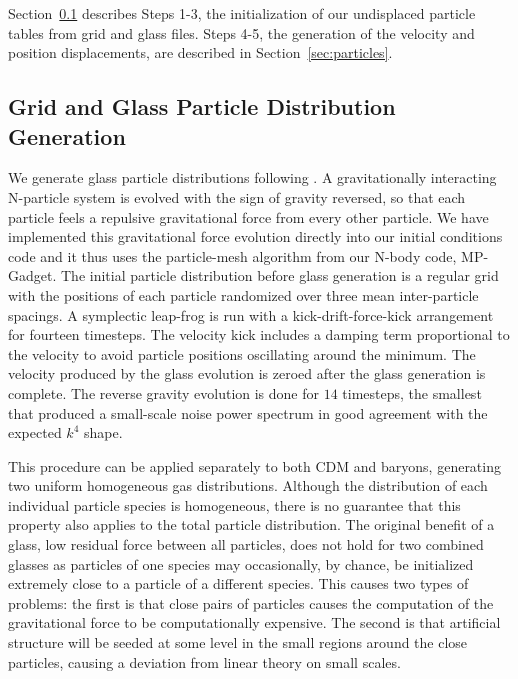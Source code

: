 \documentclass[a4paper,11pt]{article}
\begin{document}
Section~\ref{sec:glass} describes Steps 1-3, the initialization of our undisplaced particle tables from grid and glass files. Steps 4-5, the generation of the velocity and position displacements, are described in Section~\ref{sec:particles}.

\subsection{Grid and Glass Particle Distribution Generation}
\label{sec:glass}

We generate glass particle distributions following \cite{White:1994}. A gravitationally interacting N-particle system is evolved with the sign of gravity reversed, so that each particle feels a repulsive gravitational force from every other particle. We have implemented this gravitational force evolution directly into our initial conditions code and it thus uses the particle-mesh algorithm from our N-body code, MP-Gadget. The initial particle distribution before glass generation is a regular grid with the positions of each particle randomized over three mean inter-particle spacings. A symplectic leap-frog is run with a kick-drift-force-kick arrangement for fourteen timesteps. The velocity kick includes a damping term proportional to the velocity to avoid particle positions oscillating around the minimum. The velocity produced by the glass evolution is zeroed after the glass generation is complete. The reverse gravity evolution is done for $14$ timesteps, the smallest that produced a small-scale noise power spectrum in good agreement with the expected $k^4$ shape.

This procedure can be applied separately to both CDM and baryons, generating two uniform homogeneous gas distributions.
Although the distribution of each individual particle species is homogeneous, there is no guarantee that this property also applies to the total particle distribution. The original benefit of a glass, low residual force between all particles, does not hold for two combined glasses \cite{Yoshida:2003} as particles of one species may occasionally, by chance, be initialized extremely close to a particle of a different species. This causes two types of problems: the first is that close pairs of particles causes the computation of the gravitational force to be computationally expensive. The second is that artificial structure will be seeded at some level in the small regions around the close particles, causing a deviation from linear theory on small scales.
\end{document}

